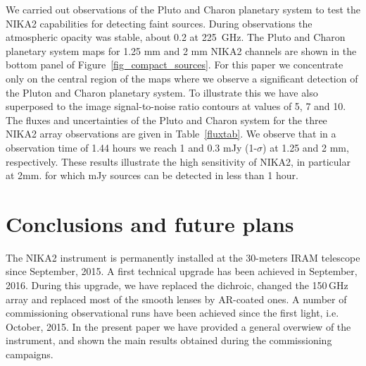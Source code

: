 \documentclass[]{aa} %
\begin{document}
We carried out observations of the Pluto and Charon planetary system to test the NIKA2 capabilities for detecting faint sources. 
During observations the atmospheric opacity was stable, about 0.2 at 225~GHz.
The Pluto and Charon planetary system maps for 1.25 mm and 2 mm NIKA2 channels are shown in the bottom panel of Figure~\ref{fig_compact_sources}. For this paper we concentrate only on the central region of the maps where we observe a significant detection of the Pluton and Charon planetary system. To illustrate this we have also superposed to the image signal-to-noise ratio contours at values of 5, 7 and 10. The fluxes and uncertainties of the Pluto and Charon system for the three NIKA2 array observations are given in Table~\ref{fluxtab}. We observe that in a observation time of 1.44 hours we reach 1 and 0.3 mJy (1-$\sigma$) at 1.25 and 2 mm, respectively.
These results illustrate the high sensitivity of NIKA2, in particular at 2mm. for which mJy sources can be detected in less than 1 hour.



%
%





\section{Conclusions and future plans}

The NIKA2 instrument is permanently installed at the 30-meters IRAM telescope since September, 2015. A first technical upgrade has been achieved in September, 2016. During this upgrade, we have replaced the dichroic, changed the 150\,GHz array and replaced most of the smooth lenses by AR-coated ones. A number of commissioning observational runs have been achieved since the first light, i.e. October, 2015. In the present paper we have provided a general overwiew of the instrument, and shown the main results obtained during the commissioning campaigns. 
\end{document}
